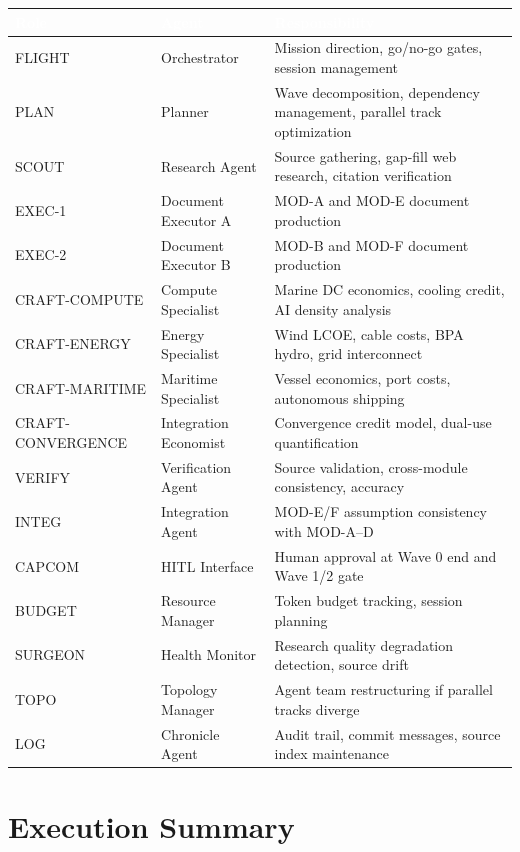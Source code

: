 \documentclass[11pt,letterpaper]{article}
\newcommand{\tableheader}[1]{\textbf{\sffamily\textcolor{white}{#1}}}
\begin{document}
\begin{center}
\begin{tabularx}{\textwidth}{L{3cm}L{3.5cm}X}
\toprule
{}
\tableheader{Role} & \tableheader{Agent} & \tableheader{Responsibility} \\
\midrule
FLIGHT & Orchestrator & Mission direction, go/no-go gates, session management \\
PLAN & Planner & Wave decomposition, dependency management, parallel track optimization \\
SCOUT & Research Agent & Source gathering, gap-fill web research, citation verification \\
EXEC-1 & Document Executor A & MOD-A and MOD-E document production \\
EXEC-2 & Document Executor B & MOD-B and MOD-F document production \\
CRAFT-COMPUTE & Compute Specialist & Marine DC economics, cooling credit, AI density analysis \\
CRAFT-ENERGY & Energy Specialist & Wind LCOE, cable costs, BPA hydro, grid interconnect \\
CRAFT-MARITIME & Maritime Specialist & Vessel economics, port costs, autonomous shipping \\
CRAFT-CONVERGENCE & Integration Economist & Convergence credit model, dual-use quantification \\
VERIFY & Verification Agent & Source validation, cross-module consistency, accuracy \\
INTEG & Integration Agent & MOD-E/F assumption consistency with MOD-A--D \\
CAPCOM & HITL Interface & Human approval at Wave 0 end and Wave 1/2 gate \\
BUDGET & Resource Manager & Token budget tracking, session planning \\
SURGEON & Health Monitor & Research quality degradation detection, source drift \\
TOPO & Topology Manager & Agent team restructuring if parallel tracks diverge \\
LOG & Chronicle Agent & Audit trail, commit messages, source index maintenance \\
\bottomrule
\end{tabularx}
\end{center}

\section{Execution Summary}
\end{document}
